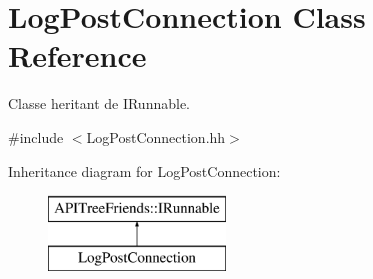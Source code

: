 \hypertarget{class_log_post_connection}{}\section{Log\+Post\+Connection Class Reference}
\label{class_log_post_connection}


Classe heritant de I\+Runnable.  




{\ttfamily \#include $<$Log\+Post\+Connection.\+hh$>$}

Inheritance diagram for Log\+Post\+Connection\+:\begin{figure}[H]
\begin{center}
\leavevmode
\includegraphics[height=2.000000cm]{class_log_post_connection}
\end{center}
\end{figure}
